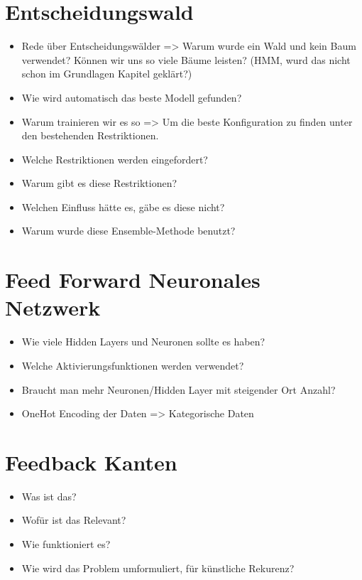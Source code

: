 

\section{Entscheidungswald}
\begin{itemize}
    \item Rede über Entscheidungswälder => Warum wurde ein Wald und kein Baum verwendet? Können wir uns so viele Bäume leisten? (HMM, wurd das nicht schon im Grundlagen Kapitel geklärt?)
    \item Wie wird automatisch das beste Modell gefunden?
    \item Warum trainieren wir es so => Um die beste Konfiguration zu finden unter den bestehenden Restriktionen.
    \item Welche Restriktionen werden eingefordert?
    \item Warum gibt es diese Restriktionen?
    \item Welchen Einfluss hätte es, gäbe es diese nicht?
    \item Warum wurde diese Ensemble-Methode benutzt?
\end{itemize}

\section{Feed Forward Neuronales Netzwerk}
\begin{itemize}
    \item Wie viele Hidden Layers und Neuronen sollte es haben?
    \item Welche Aktivierungsfunktionen werden verwendet?
    \item Braucht man mehr Neuronen/Hidden Layer mit steigender Ort Anzahl?
    \item OneHot Encoding der Daten => Kategorische Daten
\end{itemize}

\section{Feedback Kanten}
\begin{itemize}
    \item Was ist das?
    \item Wofür ist das Relevant?
    \item Wie funktioniert es?
    \item Wie wird das Problem umformuliert, für künstliche Rekurenz?
\end{itemize}

